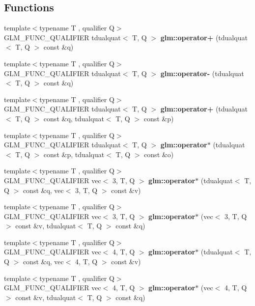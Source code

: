 \subsection*{Functions}
\begin{DoxyCompactItemize}
\item 
{\footnotesize template$<$typename T , qualifier Q$>$ }\\G\+L\+M\+\_\+\+F\+U\+N\+C\+\_\+\+Q\+U\+A\+L\+I\+F\+I\+ER tdualquat$<$ T, Q $>$ {\bfseries glm\+::operator+} (tdualquat$<$ T, Q $>$ const \&q)
\item 
{\footnotesize template$<$typename T , qualifier Q$>$ }\\G\+L\+M\+\_\+\+F\+U\+N\+C\+\_\+\+Q\+U\+A\+L\+I\+F\+I\+ER tdualquat$<$ T, Q $>$ {\bfseries glm\+::operator-\/} (tdualquat$<$ T, Q $>$ const \&q)
\item 
{\footnotesize template$<$typename T , qualifier Q$>$ }\\G\+L\+M\+\_\+\+F\+U\+N\+C\+\_\+\+Q\+U\+A\+L\+I\+F\+I\+ER tdualquat$<$ T, Q $>$ {\bfseries glm\+::operator+} (tdualquat$<$ T, Q $>$ const \&q, tdualquat$<$ T, Q $>$ const \&p)
\item 
{\footnotesize template$<$typename T , qualifier Q$>$ }\\G\+L\+M\+\_\+\+F\+U\+N\+C\+\_\+\+Q\+U\+A\+L\+I\+F\+I\+ER tdualquat$<$ T, Q $>$ {\bfseries glm\+::operator$\ast$} (tdualquat$<$ T, Q $>$ const \&p, tdualquat$<$ T, Q $>$ const \&o)
\item 
{\footnotesize template$<$typename T , qualifier Q$>$ }\\G\+L\+M\+\_\+\+F\+U\+N\+C\+\_\+\+Q\+U\+A\+L\+I\+F\+I\+ER vec$<$ 3, T, Q $>$ {\bfseries glm\+::operator$\ast$} (tdualquat$<$ T, Q $>$ const \&q, vec$<$ 3, T, Q $>$ const \&v)
\item 
{\footnotesize template$<$typename T , qualifier Q$>$ }\\G\+L\+M\+\_\+\+F\+U\+N\+C\+\_\+\+Q\+U\+A\+L\+I\+F\+I\+ER vec$<$ 3, T, Q $>$ {\bfseries glm\+::operator$\ast$} (vec$<$ 3, T, Q $>$ const \&v, tdualquat$<$ T, Q $>$ const \&q)
\item 
{\footnotesize template$<$typename T , qualifier Q$>$ }\\G\+L\+M\+\_\+\+F\+U\+N\+C\+\_\+\+Q\+U\+A\+L\+I\+F\+I\+ER vec$<$ 4, T, Q $>$ {\bfseries glm\+::operator$\ast$} (tdualquat$<$ T, Q $>$ const \&q, vec$<$ 4, T, Q $>$ const \&v)
\item 
{\footnotesize template$<$typename T , qualifier Q$>$ }\\G\+L\+M\+\_\+\+F\+U\+N\+C\+\_\+\+Q\+U\+A\+L\+I\+F\+I\+ER vec$<$ 4, T, Q $>$ {\bfseries glm\+::operator$\ast$} (vec$<$ 4, T, Q $>$ const \&v, tdualquat$<$ T, Q $>$ const \&q)

\end{DoxyCompactItemize}
